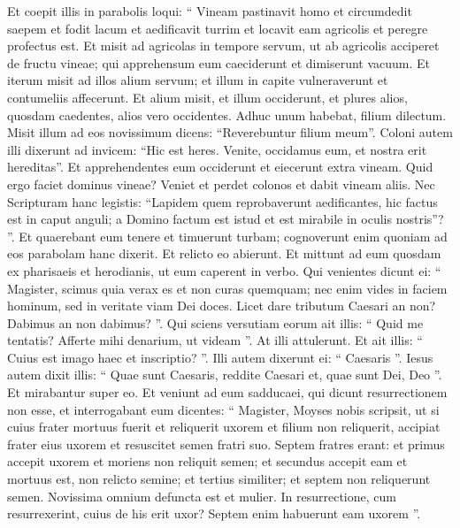 \begin{biblechapter}
\begin{biblechapter}
\begin{biblechapter}
\begin{biblechapter}
\begin{biblechapter}
\begin{biblechapter}
\begin{biblechapter}
\begin{biblechapter}
\begin{biblechapter}
\begin{biblechapter}
\begin{biblechapter}
\begin{biblechapter}
\verse Et coepit illis in parabolis loqui: “ Vineam pastinavit homo et circumdedit saepem et fodit lacum et aedificavit turrim et locavit eam agricolis et peregre profectus est. 
\verse Et misit ad agricolas in tempore servum, ut ab agricolis acciperet de fructu vineae; 
\verse qui apprehensum eum caeciderunt et dimiserunt vacuum. 
\verse Et iterum misit ad illos alium servum; et illum in capite vulneraverunt et contumeliis affecerunt. 
\verse Et alium misit, et illum occiderunt, et plures alios, quosdam caedentes, alios vero occidentes. 
\verse Adhuc unum habebat, filium dilectum. Misit illum ad eos novissimum dicens: “Reverebuntur filium meum”. 
\verse Coloni autem illi dixerunt ad invicem: “Hic est heres. Venite, occidamus eum, et nostra erit hereditas”. 
\verse Et apprehendentes eum occiderunt et eiecerunt extra vineam. 
\verse Quid ergo faciet dominus vineae? Veniet et perdet colonos et dabit vineam aliis. 
\verse Nec Scripturam hanc legistis: “Lapidem quem reprobaverunt aedificantes,
 hic factus est in caput anguli;
 \verse a Domino factum est istud
 et est mirabile in oculis nostris”? ”.
 \verse Et quaerebant eum tenere et timuerunt turbam; cognoverunt enim quoniam ad eos parabolam hanc dixerit. Et relicto eo abierunt.
 \verse Et mittunt ad eum quosdam ex pharisaeis et herodianis, ut eum caperent in verbo. 
\verse Qui venientes dicunt ei: “ Magister, scimus quia verax es et non curas quemquam; nec enim vides in faciem hominum, sed in veritate viam Dei doces. Licet dare tributum Caesari an non? Dabimus an non dabimus? ”. 
\verse Qui sciens versutiam eorum ait illis: “ Quid me tentatis? Afferte mihi denarium, ut videam ”. 
\verse At illi attulerunt. Et ait illis: “ Cuius est imago haec et inscriptio? ”. Illi autem dixerunt ei: “ Caesaris ”. 
\verse Iesus autem dixit illis: “ Quae sunt Caesaris, reddite Caesari et, quae sunt Dei, Deo ”. Et mirabantur super eo.
 \verse Et veniunt ad eum sadducaei, qui dicunt resurrectionem non esse, et interrogabant eum dicentes: 
\verse “ Magister, Moyses nobis scripsit, ut si cuius frater mortuus fuerit et reliquerit uxorem et filium non reliquerit, accipiat frater eius uxorem et resuscitet semen fratri suo. 
\verse Septem fratres erant: et primus accepit uxorem et moriens non reliquit semen; 
\verse et secundus accepit eam et mortuus est, non relicto semine; et tertius similiter; 
 \verse et septem non reliquerunt semen. Novissima omnium defuncta est et mulier. 
 \verse In resurrectione, cum resurrexerint, cuius de his erit uxor? Septem enim habuerunt eam uxorem ”. 

\end{biblechapter}
\end{biblechapter}
\end{biblechapter}
\end{biblechapter}
\end{biblechapter}
\end{biblechapter}
\end{biblechapter}
\end{biblechapter}
\end{biblechapter}
\end{biblechapter}
\end{biblechapter}
\end{biblechapter}
